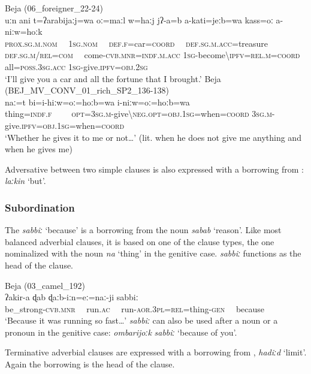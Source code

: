 \documentclass[output=paper]{langsci/langscibook}
\begin{document}
\ea\label{car}
{{Beja}{ (}{06\_foreigner\_22-24)}}\\
\gll uːn ani t=ʔarabijaːj=wa oː=maːl w=haːj jʔ-a=b a-kati=jeːb=wa kass=oː  a-niːw=hoːk\\
     \textsc{prox.sg.m.nom}~~	\textsc{1sg.nom}~~ \textsc{def.f=}car=\textsc{coord}~~ \textsc{def.sg.m.acc=}treasure \textsc{def.sg.m/rel=com}~~ come-\textsc{cvb.mnr=indf.m.acc} \textsc{1sg}-become\textsc{\textbackslash ipfv=rel.m=coord} all=\textsc{poss.3sg.acc} \textsc{1sg}-give.\textsc{ipfv=obj.2sg}\\
\glt `I’ll give you a car and all the fortune that I brought.'
\ex\label{thing}
{{Beja (}BEJ\_MV\_CONV\_01\_rich\_SP2\_136-138)}\\
\gll naː=t bi=i-hiːw=oː=hoːb=wa i-niːw=oː=hoːb=wa\\
     thing=\textsc{indf.f}~~~~ \textsc{opt=3sg.m-}give\textsc{\textbackslash neg.opt=obj.1sg}=when=\textsc{coord} \textsc{3sg.m-}give.\textsc{ipfv=obj.1sg}=when=\textsc{coord}\\
\glt `Whether he gives it to me or not…' (lit. when he does not give me anything and when he gives me)
\z

Adversative  between two simple clauses is also expressed with a borrowing from : \textit{laːkin} ‘but’.


 \subsubsection{Subordination}

The  \textit{sabbiː} ‘because’ is a borrowing from the  noun \textit{sabab} ‘reason’. Like most balanced adverbial clauses, it is based on one of the  clause types, the one nominalized with the noun \textit{na} ‘thing’ in the genitive case. \textit{sabbiː} functions as the head of the  clause.

\ea
{Beja ({03\_camel\_192)}}\\
\gll ʔakir-a ɖab ɖaːb-iːn=eː=naː-ji sabbiː\\
     be\_strong-\textsc{cvb.mnr}~~ run.\textsc{ac}~~ run-\textsc{aor.3pl=rel}=thing-\textsc{gen}~~ because\\
\glt `Because it was running so fast…'
\z
\textit{sabbiː} can also be used after a noun or a pronoun in the genitive case: \textit{ombarijoːk} \textit{sabbiː} ‘because of you’.

Terminative adverbial clauses are expressed with a borrowing from , \textit{hadiːd} ‘limit’. Again the borrowing is the head of the  clause.
\end{document}
